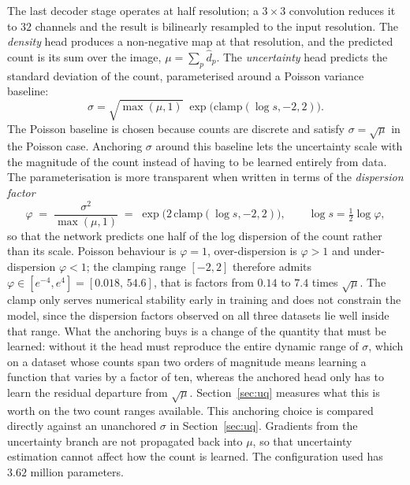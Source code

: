 \documentclass[preprint,12pt]{elsarticle}
\begin{document}
The last decoder stage operates at half resolution; a $3\times3$ convolution reduces it to $32$ channels and
the result is bilinearly resampled to the input resolution. The \emph{density} head produces a non-negative map
at that resolution, and the predicted count is its sum over the image, $\mu = \sum_p \hat d_p$. The
\emph{uncertainty} head predicts the standard deviation of the count, parameterised around a Poisson variance
baseline:
\begin{equation}
\sigma = \sqrt{\max(\mu,1)}\;\exp\!\big(\mathrm{clamp}(\log s,-2,2)\big).
\end{equation}
The Poisson baseline is chosen because counts are discrete and satisfy $\sigma = \sqrt{\mu}$ in the Poisson
case. Anchoring $\sigma$ around this baseline lets the uncertainty scale with the magnitude of the count
instead of having to be learned entirely from data. The parameterisation is more transparent when written in
terms of the \emph{dispersion factor}
\begin{equation}
\varphi \;=\; \frac{\sigma^2}{\max(\mu,1)} \;=\; \exp\!\big(2\,\mathrm{clamp}(\log s,-2,2)\big),
\qquad \log s = \tfrac{1}{2}\log\varphi ,
\end{equation}
so that the network predicts one half of the log dispersion of the count rather than its scale. Poisson
behaviour is $\varphi = 1$, over-dispersion is $\varphi > 1$ and under-dispersion $\varphi < 1$; the clamping
range $[-2,2]$ therefore admits $\varphi \in [e^{-4}, e^{4}] = [0.018,\,54.6]$, that is factors from $0.14$ to
$7.4$ times $\sqrt{\mu}$. The clamp only serves numerical stability early in training and does not constrain
the model, since the dispersion factors observed on all three datasets lie well inside that range. What the
anchoring buys is a change of the quantity that must be learned: without it the head must reproduce the entire
dynamic range of $\sigma$, which on a dataset whose counts span two orders of magnitude means learning a
function that varies by a factor of ten, whereas the anchored head only has to learn the residual departure
from $\sqrt{\mu}$. Section~\ref{sec:uq} measures what this is worth on the two count ranges available. This anchoring choice is compared directly against an unanchored $\sigma$ in
Section~\ref{sec:uq}. Gradients from the uncertainty branch are not propagated back into $\mu$, so that
uncertainty estimation cannot affect how the count is learned. The configuration used has $3.62$ million
parameters.
\end{document}
